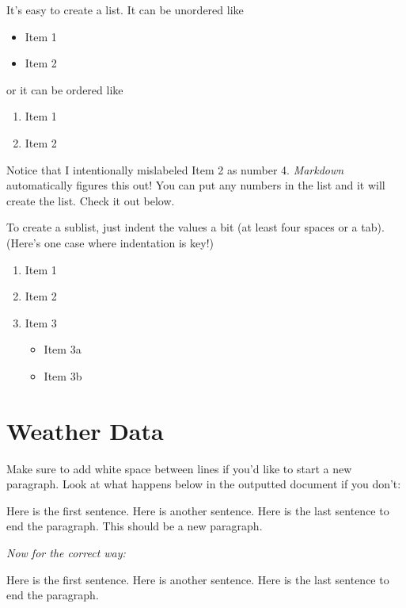 \documentclass[12pt,twoside]{reedthesis}
\providecommand{\tightlist}{%
  \setlength{\itemsep}{0pt}\setlength{\parskip}{0pt}}
\begin{document}
  It's easy to create a list. It can be unordered like
  
  \begin{itemize}
  \tightlist
  \item
    Item 1
  \item
    Item 2
  \end{itemize}
  
  or it can be ordered like
  
  \begin{enumerate}
  \def\labelenumi{\arabic{enumi}.}
  \tightlist
  \item
    Item 1
  \item
    Item 2
  \end{enumerate}
  
  Notice that I intentionally mislabeled Item 2 as number 4.
  \emph{Markdown} automatically figures this out! You can put any numbers
  in the list and it will create the list. Check it out below.
  
  To create a sublist, just indent the values a bit (at least four spaces
  or a tab). (Here's one case where indentation is key!)
  
  \begin{enumerate}
  \def\labelenumi{\arabic{enumi}.}
  \tightlist
  \item
    Item 1
  \item
    Item 2
  \item
    Item 3
  
    \begin{itemize}
    \tightlist
    \item
      Item 3a
    \item
      Item 3b
    \end{itemize}
  \end{enumerate}
  
  \section{Weather Data}\label{weather-data}
  
  Make sure to add white space between lines if you'd like to start a new
  paragraph. Look at what happens below in the outputted document if you
  don't:
  
  Here is the first sentence. Here is another sentence. Here is the last
  sentence to end the paragraph. This should be a new paragraph.
  
  \emph{Now for the correct way:}
  
  Here is the first sentence. Here is another sentence. Here is the last
  sentence to end the paragraph.
  
\end{document}

